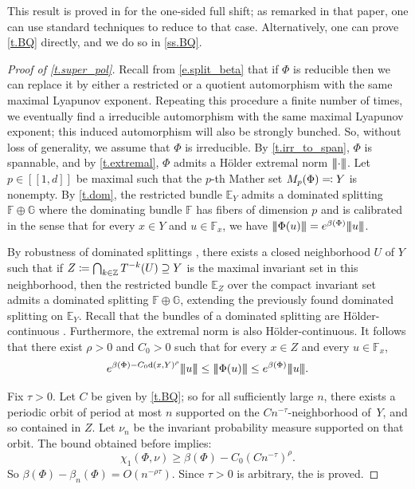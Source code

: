 \documentclass[JEP,XML,SOM,Unicode]{cedram}
\newcommand{\ldbrack}{[\![}
\newcommand{\rdbrack}{]\!]}
\def\vcentcolon{\mathrel{\mathop\ordinarycolon}}
\providecommand\ordinarycolon{:}
\providecommand*\coloneqq{\vcentcolon\mathrel{\mkern-1.2mu}=}
\providecommand*\eqqcolon{=\mathrel{\mkern-1.2mu}\vcentcolon}
\let\eqcolon\eqqcolon
\theoremstyle{plain}
\theoremstyle{definition}
\newcommand{\tribar}[1]{\mathopen{| {\kern -1.5pt} | {\kern -1.5pt} |} {#1}
\mathclose{| {\kern -1.5pt} | {\kern -1.5pt} |}}
\newcommand{\ZZ}{\mathbb{Z}}
\newcommand{\EE}{\mathbb{E}}
\newcommand{\FF}{\mathbb{F}}
\newcommand{\GG}{\mathbb{G}}
\newcommand{\dd}{\mathrm{d}}
\begin{document}
This result is proved in \cite{BQuas} for the one-sided full shift; as remarked in that paper, one can use standard techniques to reduce to that case. Alternatively, one can prove \cref{t.BQ} directly, and we do so in \cref{ss.BQ}.

\begin{proof}[Proof of \cref{t.super_pol}]
Recall from \eqref{e.split_beta} that if $\Phi$ is reducible then we can replace it by either a restricted or a quotient automorphism with the same maximal Lyapunov exponent.
Repeating this procedure a finite number of times, we eventually find a irreducible automorphism with the same maximal Lyapunov exponent; this induced automorphism will also be strongly bunched.
So, without loss of generality, we assume that $\Phi$ is irreducible.
By \cref{t.irr_to_span}, $\Phi$ is spannable, and by \cref{t.extremal}, $\Phi$ admits a Hölder extremal norm $\tribar{\mathord{\cdot}}$.
Let $p \in \ldbrack 1, d \rdbrack$ be maximal such that the $p$-th Mather set $M_p(\Phi) \eqcolon Y$ is nonempty.
By \cref{t.dom}, the restricted bundle $\EE_Y$ admits a dominated splitting $\FF \oplus \GG$ where the dominating bundle $\FF$ has fibers of dimension $p$ and is calibrated in the sense that for every $x \in Y$ and $u \in \FF_x$, we have
$\tribar{\Phi(u)} = e^{\beta(\Phi)} \tribar{u}$.
	
By robustness of dominated splittings \cite[Cor.\,2.8]{CroPo}, there exists a closed neighborhood $U$ of $Y$ such that
if $Z \coloneqq \bigcap_{k \in \ZZ} T^{-k}(U) \supseteq Y$ is the maximal invariant set in this neighborhood,
then the restricted bundle $\EE_Z$ over the compact invariant set admits a dominated splitting $\FF \oplus \GG$, extending the previously found dominated splitting on $\EE_Y$.
Recall that the bundles of a dominated splitting are Hölder-continuous \cite[Th.\,4.11]{CroPo}.
Furthermore, the extremal norm is also Hölder-continuous.
It follows that there exist $\rho>0$ and $C_0>0$ such that for every $x \in Z$ and every $u \in \FF_x$,
\[
e^{\beta(\Phi) - C_0 \dd(x,Y)^\rho} \tribar{u} \le
\tribar{\Phi(u)} \le e^{\beta(\Phi)} \tribar{u}.
\]

Fix $\tau>0$.
Let $C$ be given by \cref{t.BQ}; so for all sufficiently large $n$, there exists a periodic orbit of period at most $n$ supported on the $C n^{-\tau}$-neighborhood of~$Y$, and so contained in $Z$.
Let $\nu_n$ be the invariant probability measure supported on that orbit.
The bound obtained before implies:
\[
\chi_1(\Phi,\nu) \ge \beta(\Phi) - C_0 (C n^{-\tau})^\rho.
\]
So $\beta(\Phi) - \beta_n(\Phi) = O(n^{-\rho \tau})$.
Since $\tau>0$ is arbitrary, the  is proved.
\end{proof}
\end{document}
